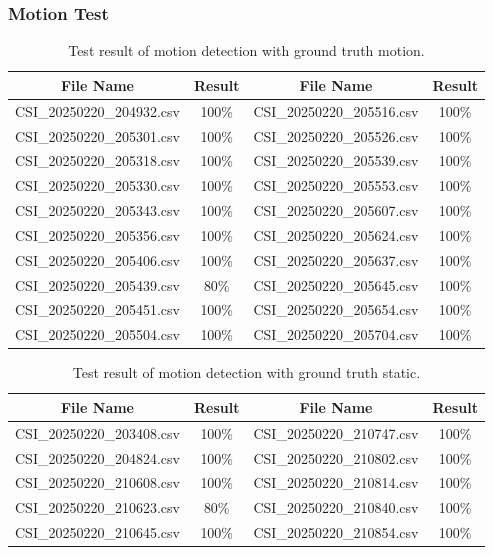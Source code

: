 \subsubsection{Motion Test}

\begin{table}[htbp]
    \centering
    \caption{Test result of motion detection with ground truth motion.}
    \label{table:motion_detection_motion}
        \begin{tabular}{cc|cc}
        \toprule
        \textbf{File Name} & \textbf{Result} & \textbf{File Name} & \textbf{Result} \\
        \midrule
        CSI\_20250220\_204932.csv & 100\% & CSI\_20250220\_205516.csv & 100\%\\
        CSI\_20250220\_205301.csv & 100\% & CSI\_20250220\_205526.csv & 100\%\\
        CSI\_20250220\_205318.csv & 100\% & CSI\_20250220\_205539.csv & 100\%\\
        CSI\_20250220\_205330.csv & 100\% & CSI\_20250220\_205553.csv & 100\%\\
        CSI\_20250220\_205343.csv & 100\% & CSI\_20250220\_205607.csv & 100\%\\
        CSI\_20250220\_205356.csv & 100\% & CSI\_20250220\_205624.csv & 100\%\\
        CSI\_20250220\_205406.csv & 100\% & CSI\_20250220\_205637.csv & 100\%\\
        CSI\_20250220\_205439.csv & 80\%  & CSI\_20250220\_205645.csv & 100\%\\
        CSI\_20250220\_205451.csv & 100\% & CSI\_20250220\_205654.csv & 100\%\\
        CSI\_20250220\_205504.csv & 100\% & CSI\_20250220\_205704.csv & 100\%\\
        \bottomrule
        \end{tabular}
    \end{table}
    
    \begin{table}[htbp]
        \centering
        \caption{Test result of motion detection with ground truth static.}
        \label{table:motion_detection_static}
            \begin{tabular}{cc|cc}
            \toprule
            \textbf{File Name} & \textbf{Result} & \textbf{File Name} & \textbf{Result} \\
            \midrule
            CSI\_20250220\_203408.csv & 100\% & CSI\_20250220\_210747.csv & 100\%\\
            CSI\_20250220\_204824.csv & 100\% & CSI\_20250220\_210802.csv & 100\%\\
            CSI\_20250220\_210608.csv & 100\% & CSI\_20250220\_210814.csv & 100\%\\
            CSI\_20250220\_210623.csv & 80\% & CSI\_20250220\_210840.csv & 100\%\\
            CSI\_20250220\_210645.csv & 100\% & CSI\_20250220\_210854.csv & 100\%\\
            \bottomrule
            \end{tabular}
        \end{table}

